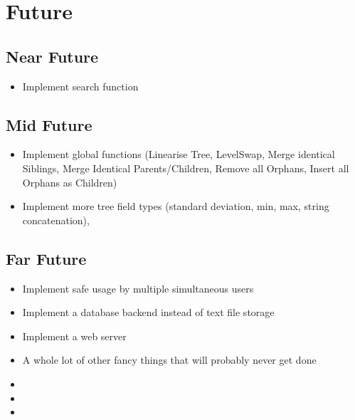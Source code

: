 \documentclass[letterpaper,10pt,english]{sphinxmanual}
\begin{document}
\section{Future}
\label{\detokenize{releases:future}}

\subsection{Near Future}
\label{\detokenize{releases:near-future}}\begin{itemize}
\item {} 
\sphinxAtStartPar
Implement search function

\end{itemize}


\subsection{Mid Future}
\label{\detokenize{releases:mid-future}}\begin{itemize}
\item {} 
\sphinxAtStartPar
Implement global functions (Linearise Tree, Level\sphinxhyphen{}Swap, Merge identical Siblings, Merge Identical Parents/Children, Remove all Orphans, Insert all Orphans as Children)

\item {} 
\sphinxAtStartPar
Implement more tree field types (standard deviation, min, max, string concatenation),

\end{itemize}


\subsection{Far Future}
\label{\detokenize{releases:far-future}}\begin{itemize}
\item {} 
\sphinxAtStartPar
Implement safe usage by multiple simultaneous users

\item {} 
\sphinxAtStartPar
Implement a database backend instead of text file storage

\item {} 
\sphinxAtStartPar
Implement a web server

\item {} 
\sphinxAtStartPar
A whole lot of other fancy things that will probably never get done

\end{itemize}
\begin{itemize}
\item {} 
\sphinxAtStartPar
{}

\item {} 
\sphinxAtStartPar
{}

\item {} 
\sphinxAtStartPar
{}

\end{itemize}



\renewcommand{\indexname}{Index}
\printindex
\end{document}
